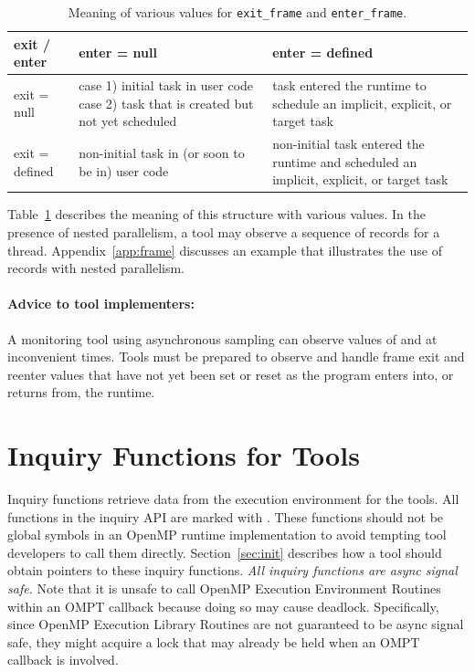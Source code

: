 \documentclass{article}
\begin{document}
\begin{table}
\begin{center}
\begin{tabular}{|l|p{2in}|p{2in}|}
\hline
exit / enter 	& enter = null										& enter = defined \\\hline\hline
exit = null		& case 1)  initial task in user code case 2) task that is created but not yet scheduled &  task entered the runtime to schedule an implicit, explicit, or target task \\\hline
exit = defined 	& non-initial task in (or soon to be in) user code							& non-initial task entered the runtime and scheduled an implicit, explicit, or target task\\\hline
\end{tabular}
\end{center}
\caption{Meaning of various values for {\tt exit\_frame} and {\tt enter\_frame}.}
\label{tab:frame}
\end{table}

\noindent
Table~\ref{tab:frame} describes the meaning of this structure with various values.
In the presence of nested parallelism, a tool may observe a sequence of  records for a thread. Appendix~\ref{app:frame} discusses  an example that illustrates the use of  records with nested parallelism.

\paragraph{Advice to tool implementers:} A monitoring tool using
      asynchronous sampling can observe values of 
       and  at inconvenient times. 
      Tools must be prepared to observe and handle frame exit and reenter values that have not yet been set or reset as the program enters into, or returns from, the runtime. 

\section{Inquiry Functions for Tools}
\label{sec:inquiry}

 Inquiry functions retrieve data from the execution environment for
 the tools. 
 All functions in the inquiry API are marked with . These functions should not be global symbols in an OpenMP runtime implementation to avoid tempting tool developers to call them directly. Section~\ref{sec:init} describes how a tool should obtain pointers to these inquiry functions.
 {\em All inquiry functions are async signal safe.} 
 Note that it is unsafe to call OpenMP Execution Environment Routines within an OMPT callback because doing so may cause deadlock. 
 Specifically, since OpenMP Execution Library Routines are not guaranteed to be async signal safe, they might acquire a lock that may already be held when an OMPT callback is involved.
 
\end{document}
